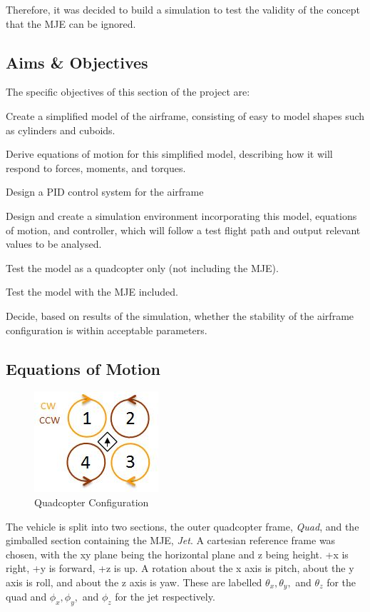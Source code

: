 \documentclass[11pt]{article}
\begin{document}
Therefore, it was decided to build a simulation to test the validity of the concept that the MJE can be ignored.

\subsection{Aims \& Objectives} \label{simulation objectives}
The specific objectives of this section of the project are:
\begin{compactenum}
    \item Create a simplified model of the airframe, consisting of easy to model shapes such as cylinders and cuboids.
    \item Derive equations of motion for this simplified model, describing how it will respond to forces, moments, and torques.
    \item Design a PID control system for the airframe
    \item Design and create a simulation environment incorporating this model, equations of motion, and controller, which will follow a test flight path and output relevant values to be analysed.
    \item Test the model as a quadcopter only (not including the MJE).
    \item Test the model with the MJE included.
    \item Decide, based on results of the simulation, whether the stability of the airframe configuration is within acceptable parameters.
\end{compactenum}

\subsection{Equations of Motion}
\begin{figure}
    \begin{center}
        \includegraphics[width=0.48\linewidth]{Quad-X}
        \caption{Quadcopter Configuration}
        \label{fig:quad-x}
    \end{center}
\end{figure}
The vehicle is split into two sections, the outer quadcopter frame, \emph{Quad}, and the gimballed section containing the MJE, \emph{Jet}. A cartesian reference frame was chosen, with the xy plane being the horizontal plane and z being height. +x is right, +y is forward, +z is up. A rotation about the x axis is pitch, about the y axis is roll, and about the z axis is yaw. These are labelled $\theta_x, \theta_y,$ and $\theta_z$ for the quad and $\phi_x, \phi_y,$ and $\phi_z$ for the jet respectively.
\end{document}
